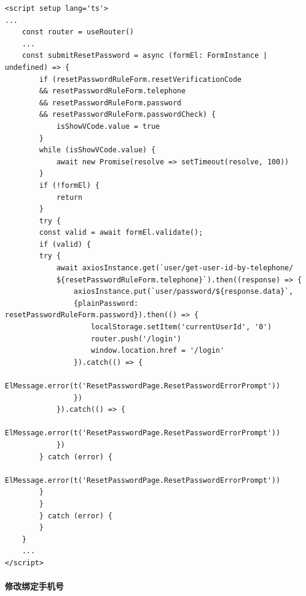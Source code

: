 \begin{itemize}
	\begin{verbatim}
<script setup lang='ts'>
...
	const router = useRouter()
	...
	const submitResetPassword = async (formEl: FormInstance | undefined) => {
		if (resetPasswordRuleForm.resetVerificationCode
		&& resetPasswordRuleForm.telephone
		&& resetPasswordRuleForm.password
		&& resetPasswordRuleForm.passwordCheck) {
			isShowVCode.value = true
		}
		while (isShowVCode.value) {
			await new Promise(resolve => setTimeout(resolve, 100))
		}
		if (!formEl) {
			return
		}
		try {
		const valid = await formEl.validate();
		if (valid) {
		try {
			await axiosInstance.get(`user/get-user-id-by-telephone/
			${resetPasswordRuleForm.telephone}`).then((response) => {
				axiosInstance.put(`user/password/${response.data}`, 
				{plainPassword: resetPasswordRuleForm.password}).then(() => {
					localStorage.setItem('currentUserId', '0')
					router.push('/login')
					window.location.href = '/login'
				}).catch(() => {
				ElMessage.error(t('ResetPasswordPage.ResetPasswordErrorPrompt'))
				})
			}).catch(() => {
				ElMessage.error(t('ResetPasswordPage.ResetPasswordErrorPrompt'))
			})
		} catch (error) {
			ElMessage.error(t('ResetPasswordPage.ResetPasswordErrorPrompt'))
		}
		}
		} catch (error) {
		}
	}
	...
</script>
	\end{verbatim}

\end{itemize}

\paragraph{修改绑定手机号}

